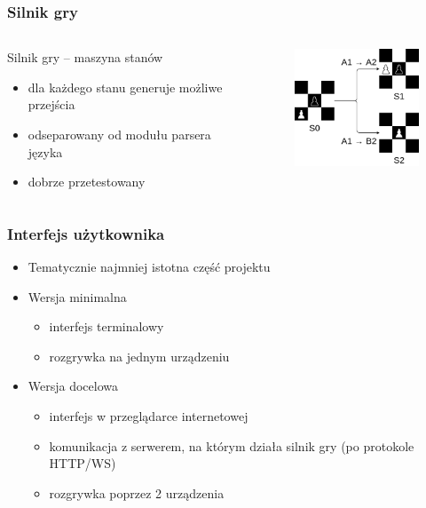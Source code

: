 \documentclass{beamer}
\begin{document}
\begin{frame}
	\frametitle{Silnik gry}
	\begin{columns}
		\begin{column}{.50\textwidth}
			Silnik gry -- maszyna stanów
			\begin{itemize}
				\item dla każdego stanu generuje możliwe przejścia
				\item odseparowany od modułu parsera języka
				\item dobrze przetestowany
			\end{itemize}
		\end{column}%
		\hfill
		\begin{column}{.50\textwidth}
			\begin{figure}
				\includegraphics[width=4.5cm]{stany.png}
				\centering
			\end{figure}
		\end{column}
	\end{columns}
\end{frame}

\begin{frame}
	\frametitle{Interfejs użytkownika}
	\begin{itemize}
		\item Tematycznie najmniej istotna część projektu
		\item Wersja minimalna
		      \begin{itemize}
			      \item interfejs terminalowy
			      \item rozgrywka na jednym urządzeniu
		      \end{itemize}
		\item Wersja docelowa
		      \begin{itemize}
			      \item interfejs w przeglądarce internetowej
			      \item komunikacja z serwerem, na którym działa silnik gry (po protokole HTTP/WS)
			      \item rozgrywka poprzez 2 urządzenia
		      \end{itemize}
	\end{itemize}
\end{frame}
\end{document}
